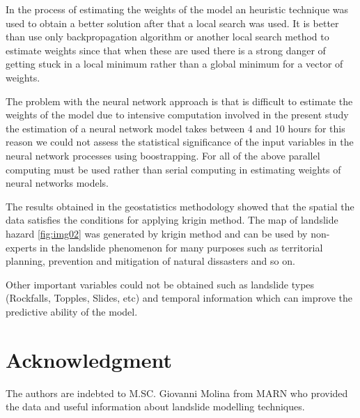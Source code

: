 \documentclass[11pt,twoside]{rmta2010esp}%
\begin{document}
In the process of estimating the weights of the model an heuristic technique was used to obtain a better solution after that a local search was used. It is better than use only backpropagation algorithm or another local search method to estimate weights since that when these are used there is a strong danger of getting stuck in a local minimum rather than a global minimum for a vector of weights.

The problem with the neural network approach is that is difficult to estimate the weights of the model due to intensive computation involved in the present study the estimation of a neural network model takes between 4 and 10 hours for this reason we could not assess the statistical significance of the input variables in the neural network processes using boostrapping. For all of the above parallel computing must be used rather than serial computing in estimating weights of neural networks models.

The results obtained in the geostatistics methodology showed that the spatial the data satisfies the conditions for applying krigin method. The map of landslide hazard \ref{fig:img02} was generated by krigin method and can be used by non-experts in the landslide phenomenon for many purposes such as territorial planning, prevention and mitigation of natural dissasters and so on. 

Other important variables could not be obtained such as landslide types (Rockfalls, Topples, Slides, etc) and temporal information which can improve the predictive ability of the model. 


\section{Acknowledgment}   
The authors are indebted to M.SC. Giovanni Molina from MARN who provided the data and useful information about landslide modelling techniques.
\end{document}
